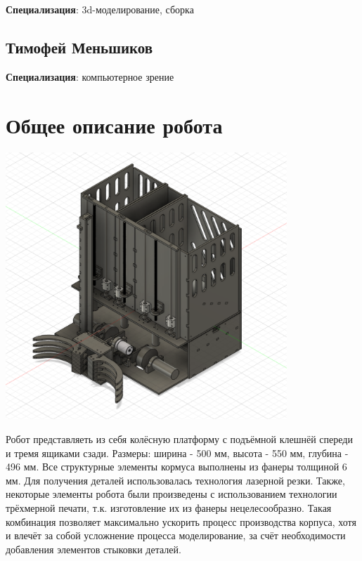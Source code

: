 \documentclass[11pt]{article}
\let\oldsection\section
\renewcommand\section{\pagebreak\oldsection}
\begin{document}
\textbf{Специализация}: 3d-моделирование, сборка
\subsection{Тимофей Меньшиков}
\label{sec:orga6bceb9}
\textbf{Специализация}: компьютерное зрение
\section{Общее описание робота}
\label{sec:orgea5ec12}
\begin{center}
\includegraphics[width=400]{./images/robot-front-view.png}
\end{center}

Робот представляеть из себя колёсную платформу с подъёмной клешнёй спереди и тремя ящиками сзади. Размеры: ширина - 500 мм, высота - 550 мм, глубина - 496 мм.
Все структурные элементы кормуса выполнены из фанеры толщиной 6 мм. Для получения деталей использовалась технология лазерной резки. Также, некоторые элементы робота были произведены с использованием технологии трёхмерной печати, т.к. изготовление их из фанеры нецелесообразно. Такая комбинация позволяет максимально ускорить процесс производства корпуса, хотя и влечёт за собой усложнение процесса моделирование, за счёт необходимости добавления элементов стыковки деталей.
\end{document}
